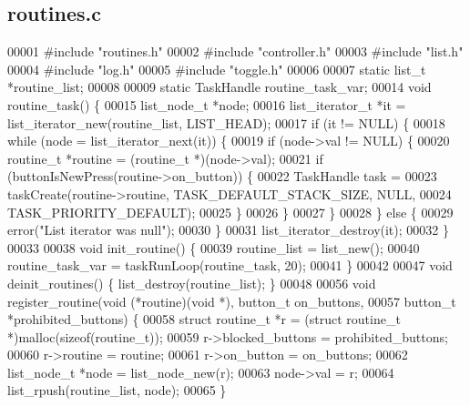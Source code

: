 \subsection{routines.\+c}
\label{routines_8c_source}

\begin{DoxyCode}
00001 \textcolor{preprocessor}{#include "routines.h"}
00002 \textcolor{preprocessor}{#include "controller.h"}
00003 \textcolor{preprocessor}{#include "list.h"}
00004 \textcolor{preprocessor}{#include "log.h"}
00005 \textcolor{preprocessor}{#include "toggle.h"}
00006 
00007 \textcolor{keyword}{static} list_t *routine_list;
00008 
00009 \textcolor{keyword}{static} TaskHandle routine_task_var;
00014 \textcolor{keywordtype}{void} routine_task() \{
00015   list_node_t *node;
00016   list_iterator_t *it = list_iterator_new(routine\_list, LIST_HEAD);
00017   \textcolor{keywordflow}{if} (it != NULL) \{
00018     \textcolor{keywordflow}{while} (node = list_iterator_next(it)) \{
00019       \textcolor{keywordflow}{if} (node->val != NULL) \{
00020         routine_t *routine = (routine_t *)(node->val);
00021         \textcolor{keywordflow}{if} (buttonIsNewPress(routine->on_button)) \{
00022           TaskHandle task =
00023               taskCreate(routine->routine, TASK\_DEFAULT\_STACK\_SIZE, NULL,
00024                          TASK\_PRIORITY\_DEFAULT);
00025         \}
00026       \}
00027     \}
00028   \} \textcolor{keywordflow}{else} \{
00029     error(\textcolor{stringliteral}{"List iterator was null"});
00030   \}
00031   list_iterator_destroy(it);
00032 \}
00033 
00038 \textcolor{keywordtype}{void} init_routine() \{
00039   routine\_list = list_new();
00040   routine_task_var = taskRunLoop(routine_task, 20);
00041 \}
00042 
00047 \textcolor{keywordtype}{void} deinit_routines() \{ list_destroy(routine\_list); \}
00048 
00056 \textcolor{keywordtype}{void} register_routine(\textcolor{keywordtype}{void} (*routine)(\textcolor{keywordtype}{void} *), button_t on\_buttons,
00057                       button_t *prohibited\_buttons) \{
00058   \textcolor{keyword}{struct }routine_t *r = (\textcolor{keyword}{struct }routine_t *)malloc(\textcolor{keyword}{sizeof}(routine_t));
00059   r->blocked_buttons = prohibited\_buttons;
00060   r->routine = routine;
00061   r->on_button = on\_buttons;
00062   list_node_t *node = list_node_new(r);
00063   node->val = r;
00064   list_rpush(routine\_list, node);
00065 \}
\end{DoxyCode}
